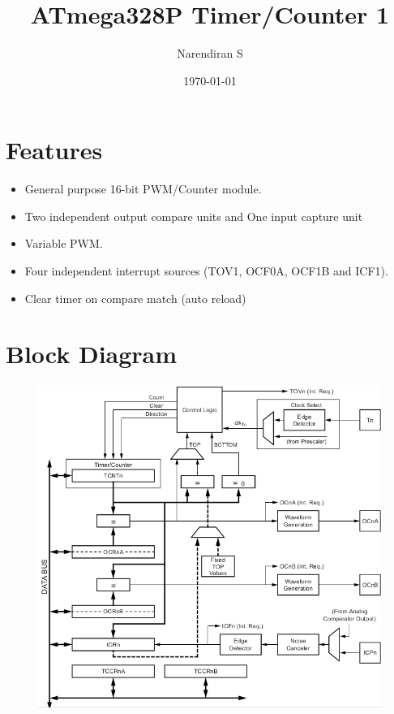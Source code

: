 \documentclass{article}
\title{ATmega328P Timer/Counter 1}
\author{Narendiran S}
\date{\today}
\begin{document}
\maketitle

\section{Features}
\begin{itemize}
    \item General purpose 16-bit PWM/Counter module.
    \item Two independent output compare units and One input capture unit
    \item Variable PWM.
    \item Four independent interrupt sources (TOV1, OCF0A, OCF1B and ICF1).
    \item Clear timer on compare match (auto reload)
\end{itemize}

\section{Block Diagram}
\begin{figure}[H]
    \begin{center}
        \includegraphics[height=0.6\textheight]{Timer1BlockDiagram.png}
    \end{center}
\end{figure}
\end{document}

